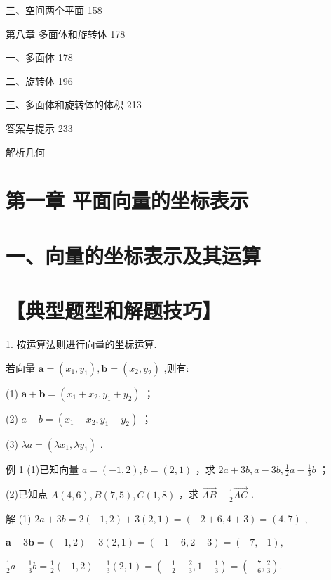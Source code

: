 \documentclass[10pt]{article}
\begin{document}
三、空间两个平面 158

第八章 多面体和旋转体 178

一、多面体 178

二、旋转体 196

三、多面体和旋转体的体积 213

答案与提示 233

解析几何

\section*{第一章 平面向量的坐标表示}

\section*{一、向量的坐标表示及其运算}

\section*{【典型题型和解题技巧】}

1. 按运算法则进行向量的坐标运算.

若向量 \(\mathbf{a} = \left( {{x}_{1},{y}_{1}}\right) ,\mathbf{b} = \left( {{x}_{2},{y}_{2}}\right)\) ,则有:

(1) \(\mathbf{a} + \mathbf{b} = \left( {{x}_{1} + {x}_{2},{y}_{1} + {y}_{2}}\right)\) ；

(2) \(a - b = \left( {{x}_{1} - {x}_{2},{y}_{1} - {y}_{2}}\right)\) ；

(3) \({\lambda a} = \left( {\lambda {x}_{1},\lambda {y}_{1}}\right)\) .

例 1 (1)已知向量 \(a = \left( {-1,2}\right) ,b = \left( {2,1}\right)\) ，求 \({2a} + {3b},a - {3b},\frac{1}{2}a - \frac{1}{3}b\) ；

(2)已知点 \(A\left( {4,6}\right) ,B\left( {7,5}\right) ,C\left( {1,8}\right)\) ，求 \(\overrightarrow{AB} - \frac{1}{2}\overrightarrow{AC}\) .

解 (1) \({2a} + {3b} = 2\left( {-1,2}\right)  + 3\left( {2,1}\right)  = \left( {-2 + 6,4 + 3}\right)  = \left( {4,7}\right)\) ,

\(\mathbf{a} - 3\mathbf{b} = \left( {-1,2}\right)  - 3\left( {2,1}\right)  = \left( {-1 - 6,2 - 3}\right)  = \left( {-7, - 1}\right) ,\)

\(\frac{1}{2}a - \frac{1}{3}b = \frac{1}{2}\left( {-1,2}\right)  - \frac{1}{3}\left( {2,1}\right)  = \left( {-\frac{1}{2} - \frac{2}{3},1 - \frac{1}{3}}\right)  = \left( {-\frac{7}{6},\frac{2}{3}}\right) .\)
\end{document}
